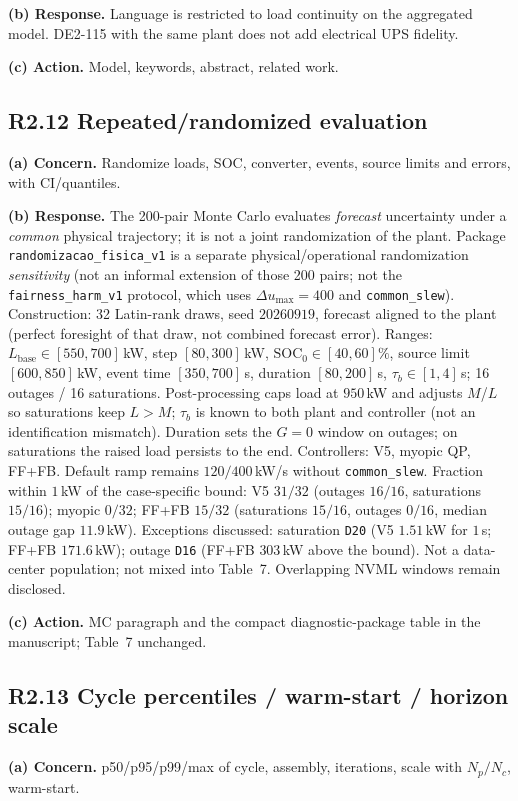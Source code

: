 \documentclass[11pt]{article}
\begin{document}
\textbf{(b) Response.} Language is restricted to load continuity on the aggregated model. DE2-115 with the same plant does not add electrical UPS fidelity.

\textbf{(c) Action.} Model, keywords, abstract, related work.

\subsection*{R2.12 Repeated/randomized evaluation}
\textbf{(a) Concern.} Randomize loads, SOC, converter, events, source limits and errors, with CI/quantiles.

\textbf{(b) Response.} The 200-pair Monte Carlo evaluates \emph{forecast} uncertainty under a \emph{common} physical trajectory; it is not a joint randomization of the plant. Package \texttt{randomizacao\_fisica\_v1} is a separate physical/operational randomization \emph{sensitivity} (not an informal extension of those 200 pairs; not the \texttt{fairness\_harm\_v1} protocol, which uses $\Delta u_{\max}=400$ and \texttt{common\_slew}). Construction: 32 Latin-rank draws, seed $20260919$, forecast aligned to the plant (perfect foresight of that draw, not combined forecast error). Ranges: $L_{\mathrm{base}}\in[550,700]$\,kW, step $[80,300]$\,kW, $\mathrm{SOC}_0\in[40,60]\%$, source limit $[600,850]$\,kW, event time $[350,700]$\,s, duration $[80,200]$\,s, $\tau_b\in[1,4]$\,s; 16 outages / 16 saturations. Post-processing caps load at $950$\,kW and adjusts $M$/$L$ so saturations keep $L>M$; $\tau_b$ is known to both plant and controller (not an identification mismatch). Duration sets the $G{=}0$ window on outages; on saturations the raised load persists to the end. Controllers: V5, myopic QP, FF+FB. Default ramp remains $120/400$\,kW/s without \texttt{common\_slew}. Fraction within $1$\,kW of the case-specific bound: V5 $31/32$ (outages $16/16$, saturations $15/16$); myopic $0/32$; FF+FB $15/32$ (saturations $15/16$, outages $0/16$, median outage gap $11.9$\,kW). Exceptions discussed: saturation \texttt{D20} (V5 $1.51$\,kW for $1$\,s; FF+FB $171.6$\,kW); outage \texttt{D16} (FF+FB $303$\,kW above the bound). Not a data-center population; not mixed into Table~7. Overlapping NVML windows remain disclosed.

\textbf{(c) Action.} MC paragraph and the compact diagnostic-package table in the manuscript; Table~7 unchanged.

\subsection*{R2.13 Cycle percentiles / warm-start / horizon scale}
\textbf{(a) Concern.} p50/p95/p99/max of cycle, assembly, iterations, scale with $N_p/N_c$, warm-start.
\end{document}

